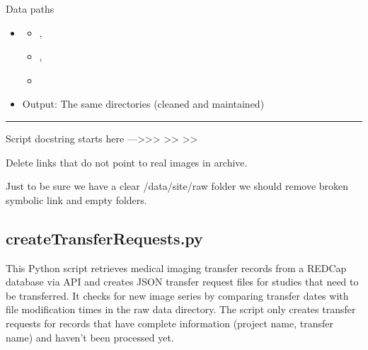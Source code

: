 \documentclass[letterpaper,10pt,english]{sphinxmanual}
\begin{document}
\sphinxAtStartPar
Data paths
\begin{itemize}
\item {} \begin{description}
\begin{itemize}
\item {} 
\sphinxAtStartPar
{},

\item {} 
\sphinxAtStartPar
{},

\item {} 
\sphinxAtStartPar
{}

\end{itemize}

\end{description}

\item {} 
\sphinxAtStartPar
Output: The same directories (cleaned and maintained)

\end{itemize}


\bigskip\hrule\bigskip


\sphinxAtStartPar
Script docstring starts here —\textgreater{}\textgreater{}\textgreater{}
\textendash{}\textgreater{}\textgreater{}
\textendash{}\textgreater{}\textgreater{}

\sphinxAtStartPar
Delete links that do not point to real images in archive.

\sphinxAtStartPar
Just to be sure we have a clear /data/site/raw folder we should remove broken symbolic link and empty folders.

\sphinxstepscope


\subsection{createTransferRequests.py}
\label{\detokenize{Architecture/scripts/createTransferRequests:createtransferrequests-py}}\label{\detokenize{Architecture/scripts/createTransferRequests::doc}}
\sphinxAtStartPar
This Python script retrieves medical imaging transfer records from a REDCap database via API and creates JSON transfer request files for studies that need to be transferred. It checks for new image series by comparing transfer dates with file modification times in the raw data directory. The script only creates transfer requests for records that have complete information (project name, transfer name) and haven’t been processed yet.
\end{document}
